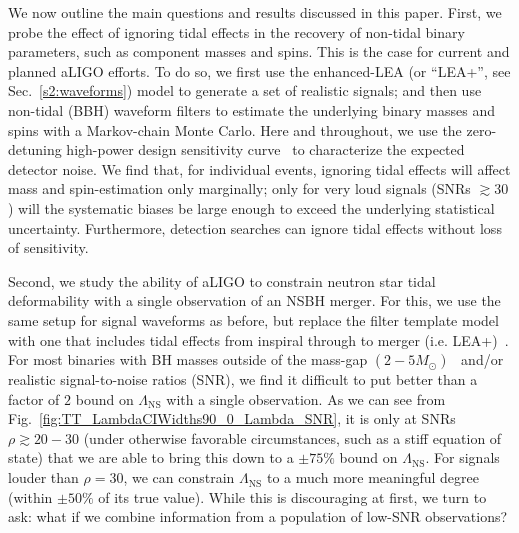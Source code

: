 \documentclass[aps,prd,amsmath,floats,floatfix, twocolumn,
superscriptaddress,nofootinbib,showpacs]{revtex4-1}
\newcommand{\lambdans}{\Lambda_\mathrm{NS}}
\begin{document}
We now outline the main questions and results discussed in this paper.
First, we probe the effect of ignoring tidal effects in
the recovery of non-tidal binary parameters, such as 
component masses and spins. This is the case for current and planned aLIGO
efforts.
To do so, we first use the enhanced-LEA (or ``LEA+'', see Sec.~\ref{s2:waveforms})
model to generate a set of realistic signals;
and then use non-tidal (BBH) waveform filters to estimate the underlying
binary masses and spins with a Markov-chain Monte Carlo. Here and throughout,
we use the zero-detuning high-power design sensitivity curve~\cite{Shoemaker2009}
to characterize the expected detector noise.
% 
We find that, for individual events, ignoring tidal effects will affect mass
and spin-estimation only marginally; only for very loud signals (SNRs $\gtrsim 30$)
will the systematic biases be large enough to exceed the underlying
statistical uncertainty. Furthermore, detection searches can ignore tidal
effects without loss of sensitivity.
% 



Second, we study the ability of aLIGO to constrain neutron star tidal 
deformability with a single observation of an NSBH merger. For this, we
use the same setup for signal waveforms as before, but replace the filter
template model with one that includes tidal effects from inspiral
through to merger (i.e. LEA+)~\cite{Lackey:2013axa}. For most binaries with
BH masses outside of the mass-gap $(2-5M_\odot)$~\cite{Bailyn:1997xt,
Kalogera:1996ci,Kreidberg:2012,Littenberg:2015tpa} and/or realistic signal-to-noise
ratios (SNR), we find it difficult to put better than a factor of $2$ bound
on $\lambdans$ with a single observation. As we can see from
Fig.~\ref{fig:TT_LambdaCIWidths90_0_Lambda_SNR}, it is only at SNRs 
$\rho\gtrsim 20-30$ (under otherwise favorable circumstances, such as a stiff
equation of state) that we are able
to bring this down to a $\pm 75\%$ bound on $\lambdans$. For signals louder
than $\rho =30$, we can constrain $\lambdans$ to a much more meaningful degree
(within $\pm 50\%$ of its true value).
While this is discouraging at first, we turn to ask: what if we combine
information from a population of low-SNR observations?
\end{document}
